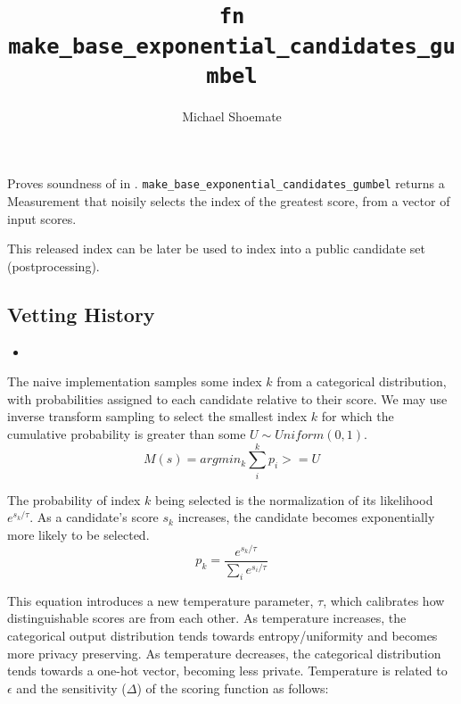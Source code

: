 \documentclass{article}
\title{\texttt{fn make\_base\_exponential\_candidates\_gumbel}}
\author{Michael Shoemate}
\begin{document}
 
\maketitle

\contrib
\floatingPoint

Proves soundness of  
in .
\texttt{make\_base\_exponential\_candidates\_gumbel} returns a Measurement that 
noisily selects the index of the greatest score, from a vector of input scores.

This released index can be later be used to index into a public candidate set (postprocessing).

\subsection*{Vetting History}
\begin{itemize}
    \item {}
\end{itemize}

The naive implementation samples some index $k$ from a categorical distribution, 
with probabilities assigned to each candidate relative to their score.
We may use inverse transform sampling to select the smallest index $k$ for which the cumulative probability is greater than some $U \sim Uniform(0, 1)$.
\begin{equation} 
    \label{m-naive} 
    M(s) = argmin_k \sum_i^k p_i >= U
\end{equation} 

The probability of index $k$ being selected is the normalization of its likelihood $e^{s_k / \tau}$.
As a candidate's score $s_k$ increases, the candidate becomes exponentially more likely to be selected.
\begin{equation}
    \label{prob-of-k}
    p_k = \frac{e^{s_k / \tau}}{\sum_i e^{s_i / \tau}}
\end{equation}

This equation introduces a new temperature parameter, $\tau$, which calibrates how distinguishable scores are from each other.
As temperature increases, the categorical output distribution tends towards entropy/uniformity and becomes more privacy preserving.
As temperature decreases, the categorical distribution tends towards a one-hot vector, becoming less private.
Temperature is related to $\epsilon$ and the sensitivity ($\Delta$) of the scoring function as follows:
\end{document}

